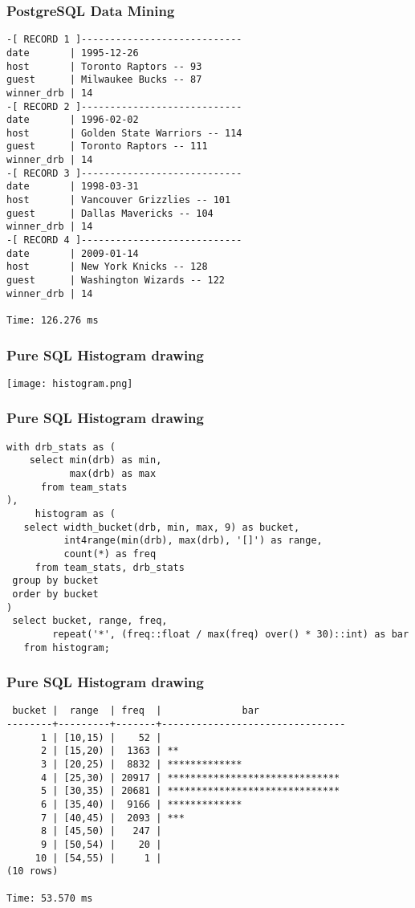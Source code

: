 \documentclass{beamer}
\begin{document}
\begin{frame}[fragile]
  \frametitle{PostgreSQL Data Mining}

\begin{verbatim}
-[ RECORD 1 ]----------------------------
date       | 1995-12-26
host       | Toronto Raptors -- 93
guest      | Milwaukee Bucks -- 87
winner_drb | 14
-[ RECORD 2 ]----------------------------
date       | 1996-02-02
host       | Golden State Warriors -- 114
guest      | Toronto Raptors -- 111
winner_drb | 14
-[ RECORD 3 ]----------------------------
date       | 1998-03-31
host       | Vancouver Grizzlies -- 101
guest      | Dallas Mavericks -- 104
winner_drb | 14
-[ RECORD 4 ]----------------------------
date       | 2009-01-14
host       | New York Knicks -- 128
guest      | Washington Wizards -- 122
winner_drb | 14

Time: 126.276 ms
\end{verbatim}
\end{frame}

\begin{frame}
  \frametitle{Pure SQL Histogram drawing}

  \begin{center}
    \texttt{[image: histogram.png]}
  \end{center}
\end{frame}

\begin{frame}[fragile]
  \frametitle{Pure SQL Histogram drawing}
  
  \begin{verbatim}
with drb_stats as (
    select min(drb) as min,
           max(drb) as max
      from team_stats
),
     histogram as (
   select width_bucket(drb, min, max, 9) as bucket,
          int4range(min(drb), max(drb), '[]') as range,
          count(*) as freq
     from team_stats, drb_stats
 group by bucket
 order by bucket
)
 select bucket, range, freq,
        repeat('*', (freq::float / max(freq) over() * 30)::int) as bar
   from histogram;
  \end{verbatim}
\end{frame}

\begin{frame}[fragile]
  \frametitle{Pure SQL Histogram drawing}
  
  \begin{verbatim}
 bucket |  range  | freq  |              bar               
--------+---------+-------+--------------------------------
      1 | [10,15) |    52 | 
      2 | [15,20) |  1363 | **
      3 | [20,25) |  8832 | *************
      4 | [25,30) | 20917 | ******************************
      5 | [30,35) | 20681 | ******************************
      6 | [35,40) |  9166 | *************
      7 | [40,45) |  2093 | ***
      8 | [45,50) |   247 | 
      9 | [50,54) |    20 | 
     10 | [54,55) |     1 | 
(10 rows)

Time: 53.570 ms
\end{verbatim}
\end{frame}
\end{document}
